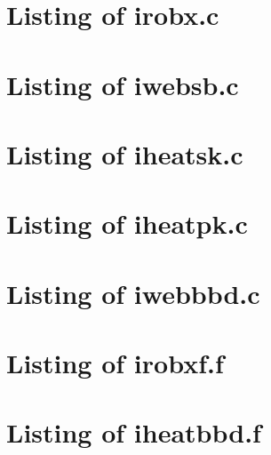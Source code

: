 
\newpage
\section{Listing of irobx.c}\label{s:irobx_c}

\newpage
\section{Listing of iwebsb.c}\label{s:iwebsb_c}

\newpage
\section{Listing of iheatsk.c}\label{s:iheatsk_c}


\newpage
\section{Listing of iheatpk.c}\label{s:iheatpk_c}

\newpage
\section{Listing of iwebbbd.c}\label{s:iwebbbd_c}

\newpage
\section{Listing of irobxf.f}\label{s:irobxf_f}

\newpage
\section{Listing of iheatbbd.f}\label{s:iheatbbdf_f}
